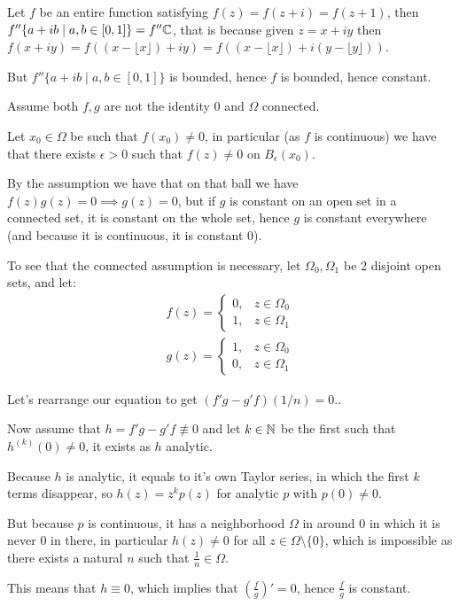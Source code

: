 \begin{cExercise}[][][][4]
	Let $f$ be an entire function satisfying $f(z)=f(z+i)=f(z+1)$, then $f''\{a+ib\mid a,b\in[0,1]\}=f''\mathbb C$, that is because given $z=x+iy$ then $f(x+iy)=f((x-\lfloor x\rfloor) + iy)=f((x-\lfloor x\rfloor) + i(y- \lfloor y\rfloor))$.
	
	But $f''\{a+ib\mid a,b\in[0,1]\}$ is bounded, hence $f$ is bounded, hence constant.
\end{cExercise}
\begin{cExercise}
	Assume both $f,g$ are not the identity $0$ and $\Omega$ connected.
	
	Let $x_0\in \Omega$ be such that $f(x_0)\ne 0$, in particular (as $f$ is continuous) we have that there exists $\epsilon>0$ such that $f(z)\ne 0$ on $B_{\epsilon}(x_0)$.
	
	By the assumption we have that on that ball we have $f(z)g(z)=0\implies g(z)=0$, but if $g$ is constant on an open set in a connected set, it is constant on the whole set, hence $g$ is constant everywhere (and because it is continuous, it is constant $0$).
	
	To see that the connected assumption is necessary, let $\Omega_0,\Omega_1$ be 2 disjoint open sets, and let:
	\begin{align*}
		f(z)=\begin{cases}
			0,&z\in\Omega_0\\
			1,&z\in\Omega_1
		\end{cases}\\
		g(z)=\begin{cases}
			1,&z\in\Omega_0\\
			0,&z\in\Omega_1
		\end{cases}
	\end{align*}
\end{cExercise}
\begin{cExercise}
	Let's rearrange our equation to get $(f'g-g'f)(1/n)=0$..
	
	Now assume that $h=f'g-g'f\not\equiv 0$ and let $k\in\mathbb N$ be the first such that $h^{(k)}(0)\ne 0$, it exists as $h$ analytic.
	
	Because $h$ is analytic, it equals to it's own Taylor series, in which the first $k$ terms disappear, so $h(z)=z^kp(z)$ for analytic $p$ with $p(0)\ne 0$.
	
	But because $p$ is continuous, it has a neighborhood $\Omega$ in around $0$ in which it is never $0$ in there, in particular $h(z)\ne 0$ for all $z\in\Omega\setminus\{0\}$, which is impossible as there exists a natural $n$ such that $\frac1n\in\Omega$.
	
	This means that $h\equiv 0$, which implies that $\left(\frac fg\right)'=0$, hence $\frac fg$ is constant.
\end{cExercise}
